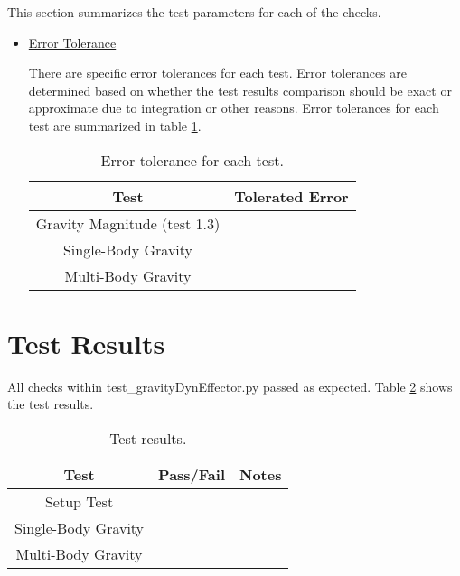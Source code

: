 \documentclass[]{BasiliskReportMemo}
\begin{document}
This section summarizes the test parameters for each of the checks. 
\begin{itemize}
\item \underline{Error Tolerance}

There are specific error tolerances for each test. Error tolerances are determined based on whether the test results comparison should be exact or approximate due to integration or other reasons. Error tolerances for each test are summarized in table \ref{tab:errortol}. 

\begin{table}[htbp]
	\caption{Error tolerance for each test.}
	\label{tab:errortol}
	\centering \fontsize{10}{10}\selectfont
	\begin{tabular}{ c | c } %
		\hline
		\textbf{Test}   							& \textbf{Tolerated Error} 						  \\ \hline
		Gravity Magnitude (test 1.3)       & 		   \\ \hline
		Single-Body Gravity						& 														   \\ \hline
		Multi-Body Gravity 						& 	 		       \\ \hline
	\end{tabular}
\end{table}
\end{itemize}

\section{Test Results}

All checks within test\_gravityDynEffector.py passed as expected. Table \ref{tab:results} shows the test results.

\begin{table}[htbp]
	\caption{Test results.}
	\label{tab:results}
	\centering \fontsize{10}{10}\selectfont
	\begin{tabular}{c | c | c  } %
		\hline
		\textbf{Test} 				    & \textbf{Pass/Fail} 						   			           & \textbf{Notes} 									\\ \hline
		Setup Test 		   			  	&      & 			 \\ \hline
		Single-Body Gravity		   	&                  &  \\ \hline
		Multi-Body Gravity			 &  			 	 &   			   \\ \hline
	\end{tabular}
\end{table}
\end{document}
